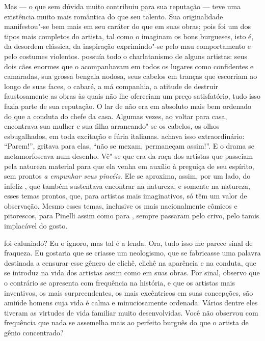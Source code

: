 Mas  --- o que sem dúvida muito contribuiu para sua reputação ---
teve uma existência muito mais romântica do que seu talento. Sua
originalidade manifestou"-se bem mais em seu caráter do que em suas
obras; pois foi um dos tipos mais completos do artista, tal como o
imaginam os bons burgueses, isto é, da desordem clássica, da inspiração
exprimindo"-se pelo mau comportamento e pelo costumes violentos. 
possuía todo o charlatanismo de alguns artistas: seus dois cães enormes
que o acompanhavam em todos os lugares como confidentes e camaradas,
sua grossa bengala nodosa, seus cabelos em tranças que escorriam ao
longo de suas faces, o cabaré, a má companhia, a atitude de destruir
faustosamente as obras às quais não lhe ofereciam um preço
satisfatório, tudo isso fazia parte de sua reputação. O lar de 
não era em absoluto mais bem ordenado do que a conduta do chefe da
casa. Algumas vezes, ao voltar para casa, encontrava sua mulher e sua
filha arrancando"-se os cabelos, os olhos esbugalhados, em toda
excitação e fúria italianas.  achava isso extraordinário:
“Parem!”, gritava para elas, “não se mexam, permaneçam assim!”. E o
drama se metamorfoseava num desenho. Vê"-se que  era da raça dos
artistas que passeiam pela natureza material para que ela venha em
auxílio à preguiça de seu espírito, sem prontos \textit{a empunhar seus
pincéis}. Ele se aproxima, assim, por um lado, do infeliz , 
que também sustentava encontrar na natureza, e somente na
natureza, esses temas prontos, que, para artistas mais imaginativos, só
têm um valor de observação. Mesmo esses temas, inclusive os mais
nacionalmente cômicos e pitorescos, para Pinelli assim como para
, sempre passaram pelo crivo, pelo tamis implacável do
gosto.

 foi caluniado? Eu o ignoro, mas tal é a lenda. Ora, tudo isso me
parece sinal de fraqueza. Eu gostaria que se criasse um neologismo, que
se fabricasse uma palavra destinada a censurar esse gênero de clichê,
clichê na aparência e na conduta, que se introduz na vida dos artistas
assim como em suas obras. Por sinal, observo que o contrário se
apresenta com frequência na história, e que os artistas mais
inventivos, os mais surpreendentes, os mais excêntricos em suas
concepções, são amiúde homens cuja vida é calma e minuciosamente
ordenada. Vários dentre eles tiveram as virtudes de vida familiar muito
desenvolvidas. Você não observou com frequência que nada se assemelha
mais ao perfeito burguês do que o artista de gênio concentrado?

